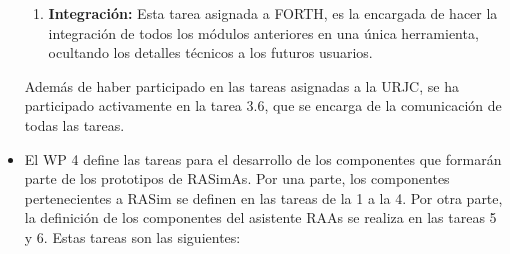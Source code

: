 \begin{itemize}
\begin{enumerate}
    \item {\textbf{Integración:}
    Esta tarea asignada a \acs{FORTH}, es la encargada de hacer la integración de todos los módulos anteriores en una única herramienta, ocultando los detalles técnicos a los futuros usuarios.}
\end{enumerate}
{Además de haber participado en las tareas asignadas a la \ac{URJC}, se ha participado activamente en la tarea 3.6, que se encarga de la comunicación de todas las tareas.}

\item
El \ac{WP} 4 define las tareas para el desarrollo de los componentes que formarán parte de los prototipos de \ac{RASimAs}. Por una parte, los componentes pertenecientes a \ac{RASim} se definen en las tareas de la 1 a la 4. Por otra parte, la definición de los componentes del asistente \ac{RAAs} se realiza en las tareas 5 y 6. Estas tareas son las siguientes:


\end{itemize}
